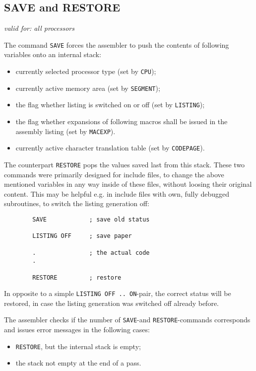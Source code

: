 \documentclass[12pt,twoside]{report}
\makeatletter
\newcommand{\tty}[1]{{\tt #1}}
\newcommand{\ttindex}[1]{\index{#1@{\tt #1}}}
\makeatother
\begin{document}

\subsection{SAVE and RESTORE}
\ttindex{SAVE}\ttindex{RESTORE}

{\em valid for: all processors}

The command \tty{SAVE} forces the assembler to push the contents of
following variables onto an internal stack:
\begin{itemize}
\item{currently selected processor type (set by \tty{CPU});}
\item{currently active memory area (set by \tty{SEGMENT});}
\item{the flag whether listing is switched on or off (set by \tty{LISTING});}
\item{the flag whether expansions of following macros shall be issued in
      the assembly listing (set by \tty{MACEXP}).}
\item{currently active character translation table (set by
      \tty{CODEPAGE}).}
\end{itemize}
The counterpart \tty{RESTORE} pops the values saved last from this stack. 
These two commands were primarily designed for include files, to change
the above mentioned variables in any way inside of these files, without
loosing their original content.  This may be helpful e.g. in include files
with own, fully debugged subroutines, to switch the listing generation
off:
\begin{verbatim}
        SAVE            ; save old status 

        LISTING OFF     ; save paper 

        .               ; the actual code
        .

        RESTORE         ; restore
\end{verbatim}
In opposite to a simple \tty{LISTING OFF .. ON}-pair, the correct status
will be restored, in case the listing generation was switched off already
before.

The assembler checks if the number of \tty{SAVE}-and
\tty{RESTORE}-commands corresponds and issues error messages in the
following cases:
\begin{itemize}
\item{\tty{RESTORE}, but the internal stack is empty;}
\item{the stack not empty at the end of a pass.}
\end{itemize}
\end{document}
